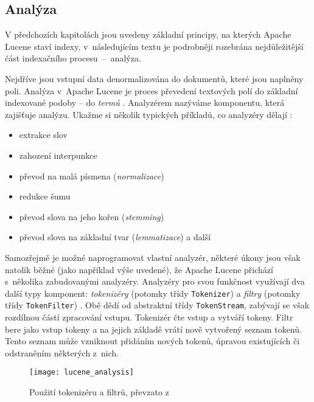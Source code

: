 \documentclass[11pt,oneside]{fithesis2}
\begin{document}
\subsection{Analýza}
\label{LuceneAnalyza}
V předchozích kapitolách jsou uvedeny základní principy, na kterých Apache Lucene staví indexy, v~následujícím textu je podrobněji rozebrána nejdůležitější část indexačního procesu~--~analýza.

Nejdříve jsou vstupní data denormalizována do dokumentů, které jsou naplněny poli. Analýza v~Apache Lucene je proces převedení textových polí do základní indexované podoby -- do \emph{termů} \cite[s.~28]{LuceneAction}. Analyzérem nazýváme komponentu, která zajišťuje analýzu. Ukažme si několik typických příkladů, co analyzéry dělají  \cite[s.~110]{LuceneAction}:

\begin{itemize}
	\item extrakce slov
	\item zahození interpunkce
	\item převod na malá písmena (\emph{normalizace})
	\item redukce šumu
	\item převod slova na jeho kořen (\emph{stemming})
	\item převod slova na základní tvar (\emph{lemmatizace}) a další
\end{itemize}

Samozřejmě je možné naprogramovat vlastní analyzér, některé úkony jsou však natolik běžné (jako například výše uvedené), že Apache Lucene přichází s~několika zabudovanými analyzéry. Analyzéry pro svou funkčnost využívají dva další typy komponent: \emph{tokenizéry} (potomky třídy \texttt{Tokenizer}) a \emph{filtry} (potomky třídy \texttt{TokenFilter})  \cite[s.~115]{LuceneAction}. Obě dědí od abstraktní třídy \texttt{TokenStream}, zabývají se však rozdílnou částí zpracování vstupu. Tokenizér čte vstup a vytváří tokeny. Filtr bere jako vstup tokeny a na jejich základě vrátí nově vytvořený seznam tokenů. Tento seznam může vzniknout přidáním nových tokenů, úpravou existujících či odstraněním některých z~nich. 

\begin{figure}[hb]
	\begin{center}
		\texttt{[image: lucene\_analysis]}
	\end{center}
	\caption{Použití tokenizéru a filtrů, převzato z~ \cite[s.~117]{LuceneAction}}	
	\label{AnalysisLucene}
\end{figure}
\end{document}
